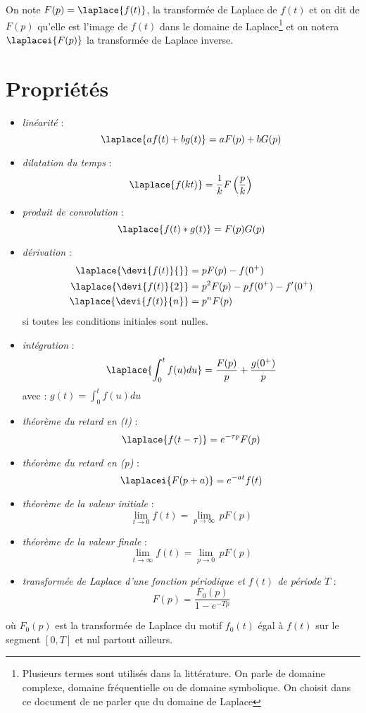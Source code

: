 On note $F(p)=\laplace{f(t)}$, la transformée de Laplace de $f(t)$ et on dit de $F(p)$ qu'elle est l'image de $f(t)$
dans le domaine de Laplace\footnote{Plusieurs termes sont utilisés dans la littérature. On parle 
de domaine complexe, domaine fréquentielle ou de domaine symbolique. On choisit dans ce document 
de ne parler que du domaine de Laplace} et on notera $\laplacei{F(p)}$ la transformée de Laplace inverse.
\section{Propriétés} 
\begin{itemize}
\item \emph{linéarité} :
$$ 
\laplace{af(t)+bg(t)} = aF(p) + bG(p)
$$ 
\item \emph{dilatation du temps} : 
$$
\laplace{f(kt)}=\dfrac{1}{k}F\left(\dfrac{p}{k}\right)
$$
\item \emph{produit de convolution} : 
$$
\laplace{f(t)*g(t)} = F(p)G(p)
$$
\item \emph{dérivation} : 
\begin{align*}
\laplace{\devi{f(t)}{}}&=pF(p) - f(0^+) \\
\laplace{\devi{f(t)}{2}}&=p^2F(p) - pf(0^+) - f'(0^+)\\
\laplace{\devi{f(t)}{n}}&=p^nF(p) 
\end{align*}
si toutes les conditions initiales sont nulles.
\item \emph{intégration} :
$$
\laplace{\int_0^t f(u)du} = \dfrac{F(p)}{p} + \dfrac{g(0^+)}{p}
$$
avec :
$g(t)=\int_0^t f(u)du$
\item \emph{théorème du retard en (t)} :
$$
\laplace{f(t-\tau)}=e^{-\tau p}F(p)
$$
\item \emph{théorème du retard en (p)} :
$$
\laplacei{F(p+a)}=e^{-at}f(t)
$$
\item \emph{théorème de la valeur initiale} :
$$
\lim\limits_{t \to 0} f(t)=\lim\limits_{p \to \infty}\, p F(p)
$$
\item \emph{théorème de la valeur finale} :
$$
\lim\limits_{t \to \infty} f(t)=\lim\limits_{p \to 0}\,p F(p)
$$
\item \emph{transformée de Laplace d'une fonction périodique et $f(t)$ de période $T$} :
$$
        F(p) = \dfrac{F_0(p)}{1-e^{-Tp}}
$$
\end{itemize}
où $F_0(p)$ est la transformée de Laplace du motif $f_0(t)$ égal à 
$f(t)$ sur le segment $[0,T]$ et nul partout ailleurs.

